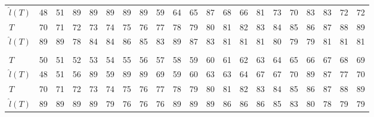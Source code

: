 \documentclass[12pt,a4paper]{article}
\begin{document}
\begin{landscape}
\begin{table}[htbp]
\begin{tabular*}{\linewidth}{@{\extracolsep{\fill}}lrrrrrrrrrrrrrrrrrrrr}
				$\hat{l}(T)$ & 48 & 51 & 89 & 89 & 89 & 89 & 89 & 59 & 64 & 65 & 87 & 68 & 66 & 81 & 73 & 70 & 83 & 83 & 72 & 72 \\
				$T$ & 70 & 71 & 72 & 73 & 74 & 75 & 76 & 77 & 78 & 79 & 80 & 81 & 82 & 83 & 84 & 85 & 86 & 87 & 88 & 89 \\
				$\hat{l}(T)$ & 89 & 89 & 78 & 84 & 84 & 86 & 85 & 83 & 89 & 87 & 83 & 81 & 81 & 81 & 80 & 79 & 79 & 81 & 81 & 81 \\
				\midrule\addlinespace[2.5pt]
				\multicolumn{21}{c}{\textbf{$\tau=0.95,\ T_{\mathrm{entry}}(5)=85$}} \\
				\addlinespace[2.5pt]
				\midrule
				$T$ & 50 & 51 & 52 & 53 & 54 & 55 & 56 & 57 & 58 & 59 & 60 & 61 & 62 & 63 & 64 & 65 & 66 & 67 & 68 & 69 \\
				$\hat{l}(T)$ & 48 & 51 & 56 & 89 & 59 & 89 & 89 & 69 & 59 & 60 & 63 & 63 & 64 & 67 & 67 & 70 & 89 & 87 & 77 & 70 \\
				$T$ & 70 & 71 & 72 & 73 & 74 & 75 & 76 & 77 & 78 & 79 & 80 & 81 & 82 & 83 & 84 & 85 & 86 & 87 & 88 & 89 \\
				$\hat{l}(T)$ & 89 & 89 & 89 & 89 & 79 & 76 & 76 & 76 & 89 & 89 & 89 & 86 & 86 & 86 & 85 & 83 & 80 & 78 & 79 & 79 \\
				\bottomrule
			\end{tabular*}
		\end{table}
	\end{landscape}
	
\end{document}
